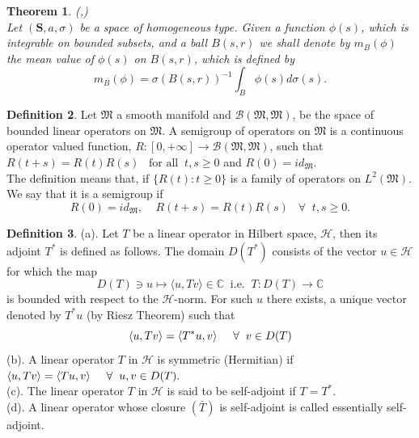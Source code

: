 \documentclass[10pt]{article}
\newtheorem{thm}{Theorem}[section]
\theoremstyle{definition}
\newtheorem{defx}[thm]{Definition}
\numberwithin{equation}{section}
\begin{document}
	\begin{thm}
		\normalfont
		(\cite{Coulhon1},\cite{Coulhon2})
		\ \\
		Let $(\textbf{S},a,\sigma)$ be a space of homogeneous type. Given a function $\phi (s)$, which is integrable on bounded subsets, and a ball $B(s,r)$ we shall denote by $m_B(\phi)$ the mean value of $\phi (s)$ on $B(s,r)$, which is defined by $$m_B(\phi)=\sigma(B(s,r))^{-1} \int_B \phi(s)d\sigma(s).$$
	\end{thm}
	\begin{defx}
		\normalfont
Let $\mathfrak{M}$  a smooth manifold and $\mathcal{B}(\mathfrak{M},\mathfrak{M})$, be the space of bounded linear operators on $\mathfrak{M}.$
A semigroup of operators on $\mathfrak{M}$ is a continuous operator valued function, $R:[0,+\infty]\longrightarrow \mathcal{B}(\mathfrak{M},\mathfrak{M})$, such that $R(t+s)=R(t)R(s)\;\;\; \mbox{for all} \;\; t,s\geq 0$ and $R(0)=id_{\mathfrak{M}}$.\\
The definition means that, if $\{R(t):t\geq0\}$ is a family of operators on $L^2(\mathfrak{M})$. We say that it is a semigroup if
		\begin{equation*}
			R(0)=id_{\mathfrak{M}},\;\;\;\; R(t+s)=R(t)R(s)\;\;\; \forall \;\; t,s\geq0.
		\end{equation*}
	\end{defx}
	
	\begin{defx}
		(a). Let $T$ be a linear operator in Hilbert space, $\mathcal{H}$, then its adjoint $T^{\ast}$ is defined as follows. The domain $D(T^{\ast})$ consists of the vector $u\in\mathcal{H}$ for which the map $$D(T)\ni u \mapsto \langle u,Tv\rangle \in \mathbb{C}\;\; \mbox{i.e.}\;\; T:D(T)\longrightarrow \mathbb{C}$$
		is bounded with respect to the $\mathcal{H}$-norm. For such $u$ there exists, a unique vector denoted by $T^{\ast}u$ (by Riesz Theorem) such that $$\langle u,Tv\rangle = \langle T^{\ast}u,v\rangle \hspace{0.5cm} \forall \hspace{0.2cm} v\in D(T)$$
		(b). A linear operator $T$ in $\mathcal{H}$ is symmetric (Hermitian) if $\langle u,Tv\rangle = \langle Tu,v\rangle \hspace{0.5cm} \forall \hspace{0.2cm} u,v\in D(T).$\\
		(c). The linear operator $T$ in $\mathcal{H}$ is said to be self-adjoint if $T=T^{\ast}$.\\
		(d). A linear operator whose closure $(\bar{T})$ is self-adjoint is called essentially self-adjoint.
\end{defx}
	
\end{document}
